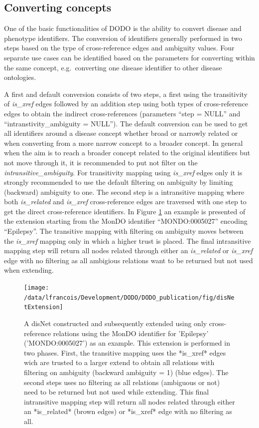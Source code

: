 \documentclass[9pt,a4paper,]{extarticle}
\begin{document}
\hypertarget{converting-concepts}{%
\subsection{Converting concepts}\label{converting-concepts}}

One of the basic functionalities of DODO is the ability to convert disease and phenotype identifiers. The conversion of identifiers generally performed in two steps based on the type of cross-reference edges and ambiguity values. Four separate use cases can be identified based on the parameters for converting within the same concept, e.g.~converting one disease identifier to other disease ontologies.

A first and default conversion consists of two steps, a first using the transitivity of \emph{is\_xref} edges followed by an addition step using both types of cross-reference edges to obtain the indirect cross-references (parameters ``step = NULL'' and ``intranstivity\_ambiguity = NULL''). The default conversion can be used to get all identifiers around a disease concept whether broad or narrowly related or when converting from a more narrow concept to a broader concept. In general when the aim is to reach a broader concept related to the original identifiers but not move through it, it is recommended to put not filter on the \emph{intransitive\_ambiguity}. For transitivity mapping using \emph{is\_xref} edges only it is strongly recommended to use the default filtering on ambiguity by limiting (backward) ambiguity to one. The second step is a intransitive mapping where both \emph{is\_related} and \emph{is\_xref} cross-reference edges are traversed with one step to get the direct cross-reference identifiers. In Figure \ref{fig:extension} an example is presented of the extension starting from the MonDO identifier ``MONDO:0005027'' encoding ``Epilepsy''. The transitive mapping with filtering on ambiguity moves between the \emph{is\_xref} mapping only in which a higher trust is placed. The final intransitive mapping step will return all nodes related through either an \emph{is\_related} or \emph{is\_xref} edge with no filtering as all ambigious relations want to be returned but not used when extending.

\begin{figure}

{\centering \texttt{[image: /data/lfrancois/Development/DODO/DODO\_publication/fig/disNetExtension]} 

}

\caption{A disNet constructed and subsequently extended using only cross-reference relations using the MonDO identifier for 'Epilepsy' ('MONDO:0005027') as an example. This extension is performed in two phases. First, the transitive mapping uses the *is\_xref* edges wich are trusted to a larger extend to obtain all relations with filtering on ambiguity (backward ambiguity = 1) (blue edges). The second steps uses no filtering as all relations (ambiguous or not) need to be returned but not used while extending. This final intransitive mapping step will return all nodes related through either an *is\_related* (brown edges) or *is\_xref* edge with no filtering as all.}\label{fig:extension}
\end{figure}
\end{document}
